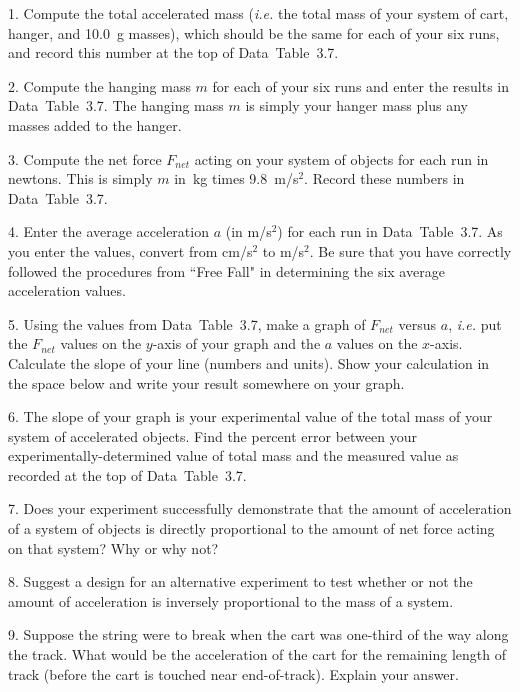 \item{1.} Compute the total accelerated mass ({\it i.e.}
the total mass of your system of cart, hanger, and 10.0~g
masses), which should be the same for each of your six runs,
and record this number at the top of Data~Table~3.7.

\item{2.} Compute the hanging mass $m$ for each of your six
runs and enter the results in Data~Table~3.7.  The hanging
mass $m$ is simply your hanger mass plus any masses added to 
the hanger.

\item{3.} Compute the net force $F_{net}$ acting on your 
system of objects for each run in newtons.  This is simply
$m$ in~kg times 9.8~m/s$^2$.  Record these numbers in 
Data~Table~3.7.

\item{4.} Enter the average acceleration $a$ (in m/s$^2$) for 
each run in Data~Table~3.7.  As you enter the values, convert 
from cm/s$^2$ to m/s$^2$.  Be sure that you have correctly 
followed the procedures from ``Free Fall" in determining the
six average acceleration values.  

\item{5.} Using the values from Data~Table~3.7, make a graph
of $F_{net}$ versus $a$, {\it i.e.} put the $F_{net}$ values
on the $y$-axis of your graph and the $a$ values on the 
$x$-axis.  Calculate the slope of your line (numbers and units).
Show your calculation in the space below and write your result
somewhere on your graph.
\item{6.} The slope of your graph is your experimental value
of the total mass of your system of accelerated objects.  Find
the percent error between your experimentally-determined value
of total mass and the measured value as recorded at the top of 
Data~Table~3.7.
\item{7.} Does your experiment successfully demonstrate that
the amount of acceleration of a system of objects is directly 
proportional to the amount of net force acting on that system?  
Why or why not?
\vfil\eject
\item{8.} Suggest a design for an alternative experiment to 
test whether or not the amount of acceleration is inversely 
proportional to the mass of a system.
\item{9.} Suppose the string were to break when the cart was
one-third of the way along the track.  What would be the 
acceleration of the cart for the remaining length of track
(before the cart is touched near end-of-track).
Explain your answer.

